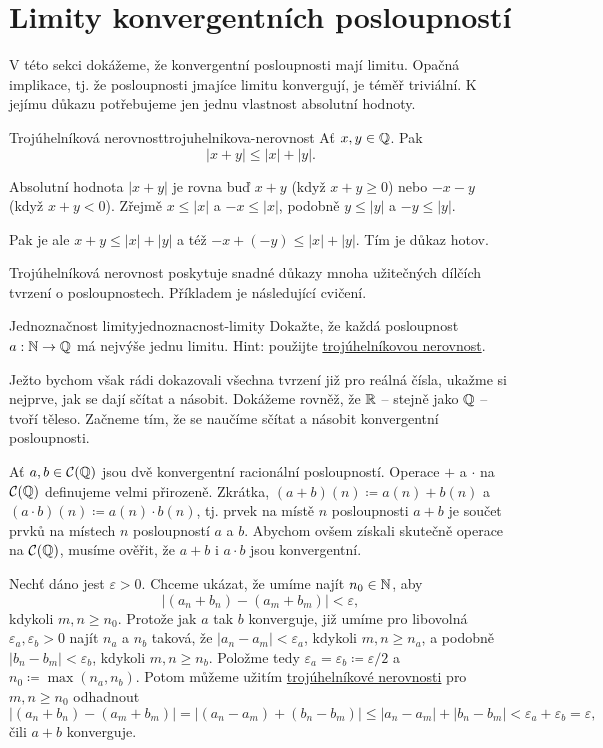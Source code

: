 \section{Limity konvergentních posloupností}
\label{sec:limity-konvergentnich-posloupnosti}

V této sekci dokážeme, že konvergentní posloupnosti mají limitu. Opačná
implikace, tj. že posloupnosti jmajíce limitu konvergují, je téměř triviální. K
jejímu důkazu potřebujeme jen jednu vlastnost absolutní hodnoty.

\begin{lemma}{Trojúhelníková nerovnost}{trojuhelnikova-nerovnost}
 Ať $x,y \in \mathbb{Q}$. Pak
 \[
  |x + y| \leq |x| + |y|.
 \]
\end{lemma}
\begin{lemproof}
 Absolutní hodnota $|x+y|$ je rovna buď $x + y$ (když $x+y \geq 0$) nebo $-x-y$
 (když $x+y<0$). Zřejmě $x \leq |x|$ a $-x \leq |x|$, podobně $y \leq |y|$ a
 $-y \leq |y|$.

 Pak je ale $x + y \leq |x| + |y|$ a též $-x+(-y) \leq |x| + |y|$. Tím je důkaz
 hotov.
\end{lemproof}

Trojúhelníková nerovnost poskytuje snadné důkazy mnoha užitečných dílčích
tvrzení o posloupnostech. Příkladem je následující cvičení.

\begin{exercise}{Jednoznačnost limity}{jednoznacnost-limity}
 Dokažte, že každá posloupnost $a:\mathbb{N} \to \mathbb{Q}$ má nejvýše jednu limitu. Hint:
 použijte \hyperref[lem:trojuhelnikova-nerovnost]{trojúhelníkovou nerovnost}.
\end{exercise}

Ježto bychom však rádi dokazovali všechna tvrzení již pro reálná čísla, ukažme
si nejprve, jak se dají sčítat a násobit. Dokážeme rovněž, že $\mathbb{R}$ -- stejně
jako $\mathbb{Q}$ -- tvoří těleso. Začneme tím, že se naučíme sčítat a násobit
konvergentní posloupnosti.

Ať $a,b \in \mathcal{C}(\mathbb{Q})$ jsou dvě konvergentní racionální posloupností.
Operace $+$ a $ \cdot $ na $\mathcal{C}(\mathbb{Q})$ definujeme velmi přirozeně.
Zkrátka, $(a+b)(n) \coloneqq a(n) + b(n)$ a $(a \cdot b)(n) \coloneqq a(n) \cdot
b(n)$, tj. prvek na místě $n$ posloupnosti $a+b$ je součet prvků na místech $n$
posloupností $a$ a $b$. Abychom ovšem získali skutečně operace na
$\mathcal{C}(\mathbb{Q})$, musíme ověřit, že $a+b$ i $a \cdot b$ jsou konvergentní.

Nechť dáno jest $\varepsilon>0$. Chceme ukázat, že umíme najít $n_0 \in \mathbb{N}$, aby
\[
 |(a_n + b_n) - (a_m + b_m)| < \varepsilon,
\]
kdykoli $m,n \geq n_0$. Protože jak $a$ tak $b$ konverguje, již umíme pro
libovolná $\varepsilon_a,\varepsilon_b>0$ najít $n_a$ a $n_b$ taková, že $|a_n -
a_m| < \varepsilon_a$, kdykoli $m,n \geq n_a$, a podobně $|b_n -
b_m|<\varepsilon_b$, kdykoli $m,n \geq n_b$. Položme tedy $\varepsilon_a =
\varepsilon_b \coloneqq \varepsilon / 2$ a $n_0 \coloneqq \max(n_a,n_b)$. Potom
můžeme užitím \hyperref[lem:trojuhelnikova-nerovnost]{trojúhelníkové nerovnosti}
pro $m,n \geq n_0$ odhadnout
\[
 |(a_n + b_n) - (a_m + b_m)| = |(a_n - a_m) + (b_n - b_m)| \leq |a_n - a_m| +
 |b_n - b_m| < \varepsilon_a + \varepsilon_b = \varepsilon,
\]
čili $a + b$ konverguje.

